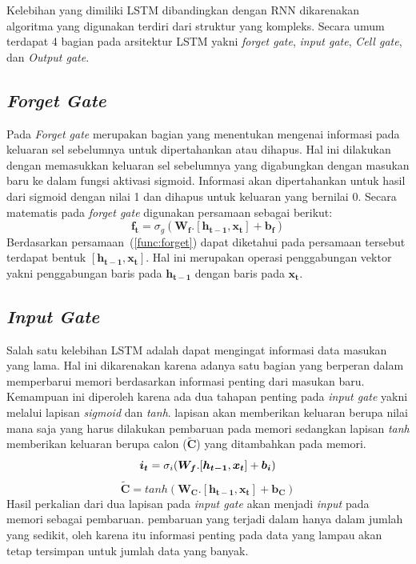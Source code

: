 Kelebihan yang dimiliki LSTM dibandingkan dengan RNN dikarenakan algoritma yang digunakan terdiri dari struktur yang kompleks. Secara umum terdapat 4 bagian pada arsitektur LSTM yakni \textit{forget gate}, \textit{input gate}, \textit{Cell gate}, dan \textit{Output gate}. 
\subsection{\textit{Forget Gate}}
Pada \textit{Forget gate} merupakan bagian yang menentukan mengenai informasi pada keluaran sel sebelumnya untuk dipertahankan atau dihapus. Hal ini dilakukan dengan memasukkan keluaran sel sebelumnya yang digabungkan dengan masukan baru ke dalam fungsi aktivasi sigmoid. Informasi akan dipertahankan untuk hasil dari sigmoid dengan nilai 1 dan dihapus untuk keluaran yang bernilai 0. Secara matematis pada \textit{forget gate} digunakan persamaan sebagai berikut:
\begin{equation}
	\boldsymbol{f_t} = \sigma_g(\boldsymbol{W_{f}}.[\boldsymbol{h_{t-1}}, \boldsymbol{x_t}] + \boldsymbol{b_f})
	\label{func:forget}
\end{equation} 
Berdasarkan persamaan~(\ref{func:forget}) dapat diketahui pada persamaan tersebut terdapat bentuk $[\boldsymbol{h_{t-1}}, \boldsymbol{x_t}]$. Hal ini merupakan operasi penggabungan vektor yakni penggabungan baris pada $\boldsymbol{h_{t-1}}$ dengan baris pada $\boldsymbol{x_t}$.
\subsection{\textit{Input Gate}}
Salah satu kelebihan LSTM adalah dapat mengingat informasi data masukan yang lama. Hal ini dikarenakan karena adanya satu bagian yang berperan dalam memperbarui memori berdasarkan informasi penting dari masukan baru. Kemampuan ini diperoleh karena ada dua tahapan penting pada \textit{input gate} yakni melalui lapisan \textit{sigmoid} dan \textit{tanh}. lapisan akan memberikan keluaran berupa nilai mana saja yang harus dilakukan pembaruan pada memori sedangkan lapisan \textit{tanh} memberikan keluaran berupa calon ($\boldsymbol{\tilde{C}}$) yang ditambahkan pada memori. 
\begin{equation}
	\boldsymbol{i_t} = \sigma_i(\boldsymbol{W_{f}}.[\boldsymbol{h_{t-1}}, \boldsymbol{x_t}] + \boldsymbol{b_i})\\
	\label{func:input}
\end{equation}
\begin{equation}
	\boldsymbol{\tilde{C}} = tanh(\boldsymbol{W_{C}}.[\boldsymbol{h_{t-1}}, \boldsymbol{x_t}] + \boldsymbol{b_C})
	\label{func:C-tilde}
\end{equation}
Hasil perkalian dari dua lapisan pada \textit{input gate} akan menjadi \textit{input} pada memori sebagai pembaruan. pembaruan yang terjadi dalam hanya dalam jumlah yang sedikit, oleh karena itu informasi penting pada data yang lampau akan tetap tersimpan untuk jumlah data yang banyak.
